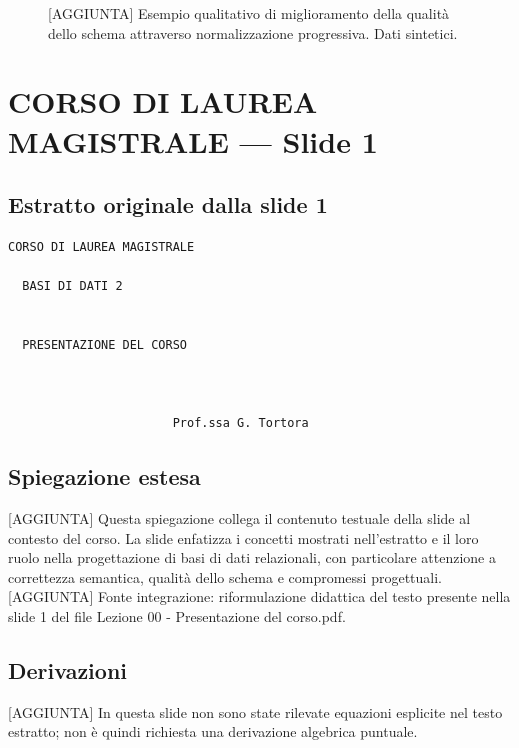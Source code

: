 \documentclass[11pt]{article}
\begin{document}
\begin{figure}[ht]
\centering
{}
\caption{[AGGIUNTA] Esempio qualitativo di miglioramento della qualità dello schema attraverso normalizzazione progressiva. Dati sintetici.}
\label{fig:miglioramento-normalizzazione}
\end{figure}
\section{CORSO DI LAUREA MAGISTRALE --- Slide 1}
\subsection*{Estratto originale dalla slide 1}
\begin{lstlisting}
CORSO DI LAUREA MAGISTRALE

  BASI DI DATI 2


  PRESENTAZIONE DEL CORSO



                       Prof.ssa G. Tortora
\end{lstlisting}
\subsection*{Spiegazione estesa}
[AGGIUNTA] Questa spiegazione collega il contenuto testuale della slide al contesto del corso. La slide enfatizza i concetti mostrati nell'estratto e il loro ruolo nella progettazione di basi di dati relazionali, con particolare attenzione a correttezza semantica, qualità dello schema e compromessi progettuali.
[AGGIUNTA] Fonte integrazione: riformulazione didattica del testo presente nella slide 1 del file Lezione 00 - Presentazione del corso.pdf.
\subsection*{Derivazioni}
[AGGIUNTA] In questa slide non sono state rilevate equazioni esplicite nel testo estratto; non è quindi richiesta una derivazione algebrica puntuale.
\end{document}
